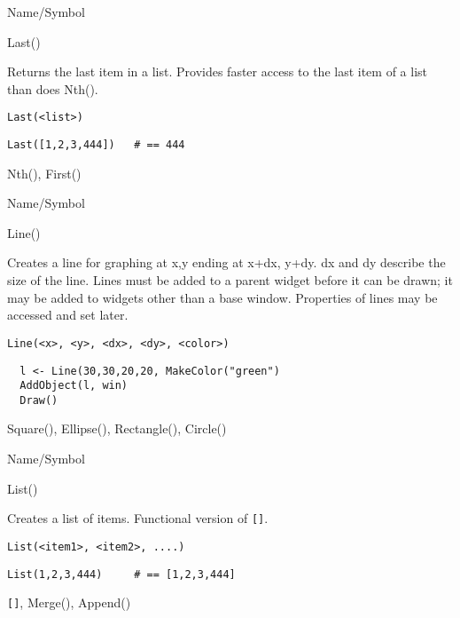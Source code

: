 \begin{desc}{Name/Symbol}
\item[Name/Symbol]	Last()

\item[Description]	Returns the last item in a list. Provides faster 
		access to the last item of a list than does Nth().

\item[Usage]
\begin{verbatim}
Last(<list>)
\end{verbatim}

\item[Example]
\begin{verbatim}
Last([1,2,3,444])	# == 444
\end{verbatim}

\item[See Also]	Nth(), First()
\end{desc}

\rl




\begin{desc}{Name/Symbol}
\item[Name/Symbol]	Line()

\item[Description]	Creates a line for graphing at x,y ending at x+dx,
  y+dy.  dx and dy describe the size of the line.  Lines must be added
  to a parent widget before it can be drawn; it may be added to
  widgets other than a base window. Properties of lines may be
  accessed and set later.

\item[Usage]
\begin{verbatim}
Line(<x>, <y>, <dx>, <dy>, <color>)
\end{verbatim}

\item[Example]	
\begin{verbatim}
  l <- Line(30,30,20,20, MakeColor("green")
  AddObject(l, win)
  Draw()

\end{verbatim}
\item[See Also]	Square(), Ellipse(), Rectangle(), Circle()
\end{desc}

\rl

\begin{desc}{Name/Symbol}
\item[Name/Symbol]	List()

\item[Description]	Creates a list of items. Functional version of \verb+[]+.

\item[Usage]
\begin{verbatim}
List(<item1>, <item2>, ....)
\end{verbatim}

\item[Example]
\begin{verbatim}
List(1,2,3,444)		# == [1,2,3,444]
\end{verbatim}

\item[See Also]	\verb+[]+, Merge(), Append()
\end{desc}

